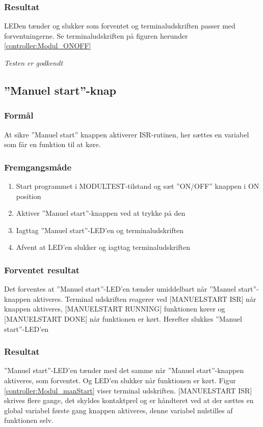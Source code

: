 \subsubsection*{Resultat} 
LEDen tænder og slukker som forventet og terminaludskriften passer med forventningerne. Se terminaludskriften på figuren herunder \ref{controller:Modul_ONOFF}

\textit{Testen er godkendt}


\subsection*{''Manuel start''-knap}

\subsubsection*{Formål}
At sikre ''Manuel start'' knappen aktiverer ISR-rutinen, her sættes en variabel som får en funktion til at køre. 

\subsubsection*{Fremgangsmåde}
\begin{enumerate}
\item Start programmet i MODULTEST-tilstand og sæt ''ON/OFF'' knappen i ON position
\item Aktiver ''Manuel start''-knappen ved at trykke på den 
\item Iagttag ''Manuel start''-LED'en og terminaludskriften
\item Afvent at LED'en slukker og iagttag terminaludskriften 
\end{enumerate}

\subsubsection*{Forventet resultat} 
Det forventes at ''Manuel start''-LED'en tænder umiddelbart når ''Manuel start''-knappen aktiveres. Terminal udskriften reagerer ved [MANUELSTART ISR] når knappen aktiveres, [MANUELSTART RUNNING] funktionen kører og [MANUELSTART DONE] når funktionen er kørt. Herefter slukkes ''Manuel start''-LED'en 

\subsubsection*{Resultat} 
''Manuel start''-LED'en tænder med det samme når ''Manuel start''-knappen aktiveres, som forventet. Og LED'en slukker når funktionen er kørt. Figur \ref{controller:Modul_manStart} viser terminal udskriften. [MANUELSTART ISR] skrives flere gange, det skyldes kontaktprel og er håndteret ved at der sættes en global variabel første gang knappen aktiveres, denne variabel nulstilles af funktionen selv.

